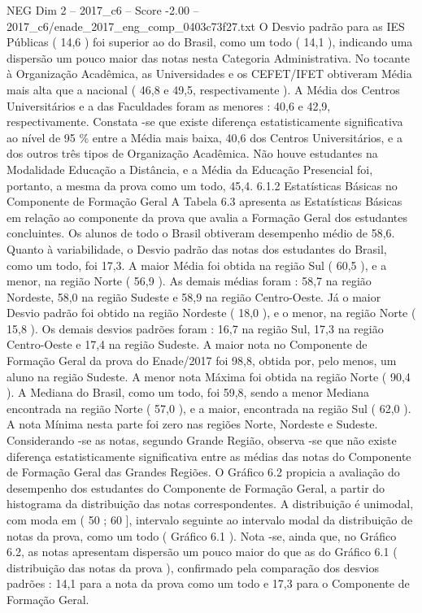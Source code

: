 \begin{textsample}{NEG Dim 2 – 2017\_c6 – Score -2.00 – 2017\_c6/enade\_2017\_eng\_comp\_0403c73f27.txt}
O Desvio padrão para as IES Públicas ( 14,6 ) foi superior ao do Brasil, como um todo ( 14,1 ), indicando uma dispersão um pouco maior das notas nesta Categoria Administrativa.
No tocante à Organização Acadêmica, as Universidades e os CEFET/IFET obtiveram Média mais alta que a nacional ( 46,8 e 49,5, respectivamente ).
A Média dos Centros Universitários e a das Faculdades foram as menores : 40,6 e 42,9, respectivamente.
Constata -se que existe diferença estatisticamente significativa ao nível de 95 \% entre a Média mais baixa, 40,6 dos Centros Universitários, e a dos outros três tipos de Organização Acadêmica.
Não houve estudantes na Modalidade Educação a Distância, e a Média da Educação Presencial foi, portanto, a mesma da prova como um todo, 45,4. 6.1.2 Estatísticas Básicas no Componente de Formação Geral A Tabela 6.3 apresenta as Estatísticas Básicas em relação ao componente da prova que avalia a Formação Geral dos estudantes concluintes.
Os alunos de todo o Brasil obtiveram desempenho médio de 58,6.
Quanto à variabilidade, o Desvio padrão das notas dos estudantes do Brasil, como um todo, foi 17,3.
A maior Média foi obtida na região Sul ( 60,5 ), e a menor, na região Norte ( 56,9 ).
As demais médias foram : 58,7 na região Nordeste, 58,0 na região Sudeste e 58,9 na região Centro-Oeste.
Já o maior Desvio padrão foi obtido na região Nordeste ( 18,0 ), e o menor, na região Norte ( 15,8 ).
Os demais desvios padrões foram : 16,7 na região Sul, 17,3 na região Centro-Oeste e 17,4 na região Sudeste.
A maior nota no Componente de Formação Geral da prova do Enade/2017 foi 98,8, obtida por, pelo menos, um aluno na região Sudeste.
A menor nota Máxima foi obtida na região Norte ( 90,4 ).
A Mediana do Brasil, como um todo, foi 59,8, sendo a menor Mediana encontrada na região Norte ( 57,0 ), e a maior, encontrada na região Sul ( 62,0 ).
A nota Mínima nesta parte foi zero nas regiões Norte, Nordeste e Sudeste.
Considerando -se as notas, segundo Grande Região, observa -se que não existe diferença estatisticamente significativa entre as médias das notas do Componente de Formação Geral das Grandes Regiões.
O Gráfico 6.2 propicia a avaliação do desempenho dos estudantes do Componente de Formação Geral, a partir do histograma da distribuição das notas correspondentes.
A distribuição é unimodal, com moda em ( 50 ; 60 ], intervalo seguinte ao intervalo modal da distribuição de notas da prova, como um todo ( Gráfico 6.1 ).
Nota -se, ainda que, no Gráfico 6.2, as notas apresentam dispersão um pouco maior do que as do Gráfico 6.1 ( distribuição das notas da prova ), confirmado pela comparação dos desvios padrões : 14,1 para a nota da prova como um todo e 17,3 para o Componente de Formação Geral.

\end{textsample}
